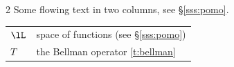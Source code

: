 \begin{multicols}{2}
Some flowing text in two columns, see \S\ref{sss:pomo}.
\end{multicols}

\begin{tabular}{ll}
$\lL$ & space of functions (see \S\ref{sss:pomo}) \\
$T$ & the Bellman operator \ref{t:bellman} \\
\end{tabular}
